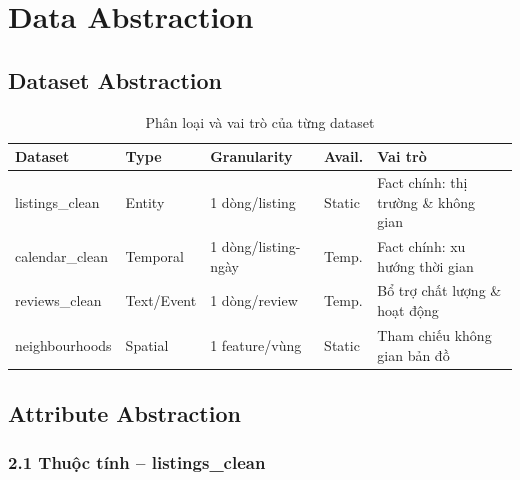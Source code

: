 \section{Data Abstraction}

\subsection{Dataset Abstraction}

\begin{table}[htbp]
    \caption{Phân loại và vai trò của từng dataset}
\small %
\centering
\begin{tabularx}{\textwidth}{@{} l l l l X @{}}
\toprule
\textbf{Dataset} & \textbf{Type} & \textbf{Granularity} & \textbf{Avail.} & \textbf{Vai trò} \\ 
\midrule
listings\_clean & Entity & 1 dòng/listing & Static & Fact chính: thị trường \& không gian \\ \hline
calendar\_clean & Temporal & 1 dòng/listing-ngày & Temp. & Fact chính: xu hướng thời gian \\ \hline
reviews\_clean & Text/Event & 1 dòng/review & Temp. & Bổ trợ chất lượng \& hoạt động \\ \hline
neighbourhoods & Spatial & 1 feature/vùng & Static & Tham chiếu không gian bản đồ \\ 

\bottomrule
\end{tabularx}
\end{table}

\subsection{Attribute Abstraction}

\subsubsection*{2.1 Thuộc tính -- listings\_clean}

